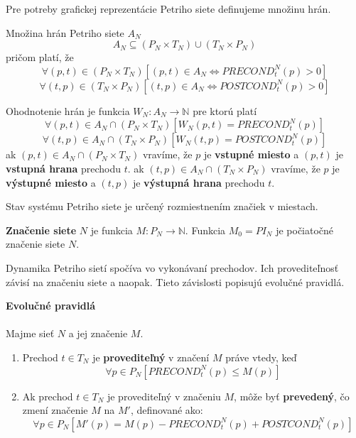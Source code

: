 Pre potreby grafickej reprezentácie Petriho siete definujeme množinu hrán.

\begin{defn}
	Množina hrán Petriho siete $A_N$
	$$ A_N \subseteq (P_N \times T_N) \cup (T_N \times P_N)$$
	pričom platí, že
	$$ \forall (p,t) \in (P_N \times T_N) [(p,t) \in A_N \Longleftrightarrow PRECOND_t^N(p) > 0 ]$$
	$$ \forall (t,p) \in (T_N \times P_N) [(t,p) \in A_N \Longleftrightarrow POSTCOND_t^N(p) > 0 ]$$
\end{defn}

\begin{defn}
	Ohodnotenie hrán je funkcia $W_N : A_N \longrightarrow \mathbb{N}$ pre ktorú platí
	$$ \forall (p,t) \in A_N \cap (P_N \times T_N) [W_N(p,t) = PRECOND_t^N(p) ]$$
	$$ \forall (t,p) \in A_N \cap (T_N \times P_N) [W_N(t,p) =  POSTCOND_t^N(p)]$$
	ak $(p,t) \in A_N \cap (P_N \times T_N)$ vravíme, že $p$ je \textbf{vstupné miesto} a $(p,t)$ je \textbf{vstupná hrana} prechodu $t$. ak $(t,p) \in A_N \cap (T_N \times P_N)$ vravíme, že $p$ je \textbf{výstupné miesto} a $(t,p)$ je \textbf{výstupná hrana} prechodu $t$.
\end{defn}

Stav systému Petriho siete je určený rozmiestnením značiek v miestach.

\begin{defn}
	\textbf{Značenie siete} $N$ je funkcia $M : P_N \longrightarrow \mathbb{N}$. Funkcia $M_0 = PI_N$ je počiatočné značenie siete $N$.
	
\end{defn}

	Dynamika Petriho sietí spočíva vo vykonávaní prechodov. Ich provediteľnosť závisí na značeniu siete a naopak. Tieto závislosti popisujú evolučné pravidlá.
	
\begin{defn}
	\textbf{Evolučné pravidlá} \\\\ Majme sieť $N$ a jej značenie $M$.
	\begin{enumerate}
		\item Prechod $t \in T_N$ je \textbf{provediteľný} v značení $M$ práve vtedy, keď
		$$ \forall p \in P_N [PRECOND_t^N(p) \leq M(p) ]$$
		\item Ak prechod $t \in T_N$ je provediteľný v značeniu $M$, môže byť \textbf{prevedený}, čo zmení značenie $M$ na $M'$, definované ako:
		$$\forall p \in P_N [M'(p)=M(p) - PRECOND_t^N(p) + POSTCOND_t^N(p) ]$$ 
	\end{enumerate}
\end{defn}  



